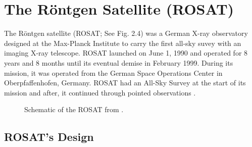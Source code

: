 \section{The R\"{o}ntgen Satellite (ROSAT)}
\label{2_2}

The R\"{o}ntgen satellite (ROSAT;  See Fig. 2.4) was a German X-ray observatory designed at the Max-Planck Institute to carry the first all-sky suvey with an imaging X-ray telescope. 
ROSAT launched on June 1, 1990 and operated for 8 years and 8 months until its eventual demise in February 1999. 
During its mission, it was operated from the German Space Operations Center in Oberpfaffenhofen, Germany. 
ROSAT had an All-Sky Survey at the start of its mission and after, it continued through pointed observations \citep{Truemper1982}.



\begin{figure}[H]
\centering
{}
\caption{Schematic of the ROSAT from \cite{Briel1996}. }
\label{imbeded_fb}
\end{figure}

\subsection{ROSAT's Design}

